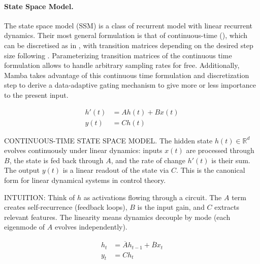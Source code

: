 
\paragraph{State Space Model.} The state space model (SSM) is a class of recurrent model with linear recurrent dynamics. Their most general formulation is that of continuous-time (), which can be discretised as in , with transition matrices depending on the desired step size following . Parameterizing transition matrices of the continuous time formulation allows to handle arbitrary sampling rates for free. Additionally, Mamba \citep{TODO:Mamba} takes advantage of this continuous time formulation and discretization step to derive a data-adaptive gating mechanism to give more or less importance to the present input.

\begin{minipage}[t]{.30\linewidth}
  \begin{subequations}
    \label{eq:ssm}
    \begin{align}
      h'(t) &= A h(t) + B x(t) \\
      y(t) &= C h(t)
    \end{align}
  \end{subequations}
\end{minipage}%

\begin{ThomasAnnotation}
  CONTINUOUS-TIME STATE SPACE MODEL. The hidden state $h(t) \in \mathbb{R}^d$ evolves continuously under linear dynamics: inputs $x(t)$ are processed through $B$, the state is fed back through $A$, and the rate of change $h'(t)$ is their sum. The output $y(t)$ is a linear readout of the state via $C$. This is the canonical form for linear dynamical systems in control theory.
  
  INTUITION: Think of $h$ as activations flowing through a circuit. The $A$ term creates self-recurrence (feedback loops), $B$ is the input gain, and $C$ extracts relevant features. The linearity means dynamics decouple by mode (each eigenmode of $A$ evolves independently).
\end{ThomasAnnotation}

\begin{minipage}[t]{.30\linewidth}
  \begin{subequations}
    \label{eq:ssm:recurrence}
    \begin{align}
    \label{eq:ssm:recurrence:1}
      h_{t} &= \overline{A} h_{t-1} + \overline{B} x_t \\
    \label{eq:ssm:recurrence:2}
      y_t &= C h_t
    \end{align}
  \end{subequations}
\end{minipage}%

